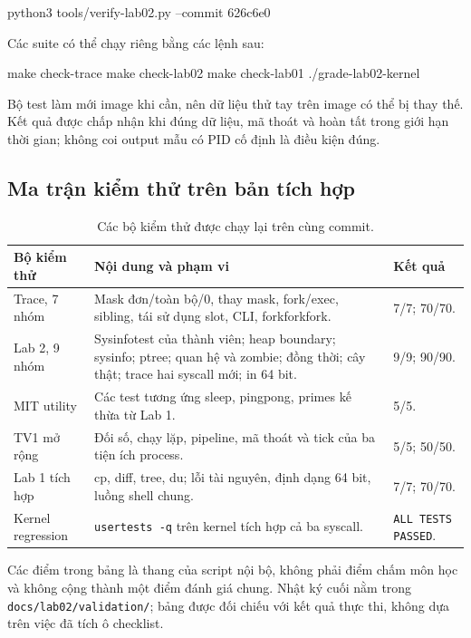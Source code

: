 \documentclass[12pt,a4paper]{article}
\newcommand{\code}[1]{\texttt{#1}}
\begin{document}
\begin{terminal}
python3 tools/verify-lab02.py --commit 626c6e0
\end{terminal}
Các suite có thể chạy riêng bằng các lệnh sau:
\begin{terminal}
make check-trace
make check-lab02
make check-lab01
./grade-lab02-kernel
\end{terminal}
Bộ test làm mới image khi cần, nên dữ liệu thử tay trên image có thể bị thay thế. Kết quả được chấp nhận khi đúng dữ liệu, mã thoát và hoàn tất trong giới hạn thời gian; không coi output mẫu có PID cố định là điều kiện đúng.

\subsection{Ma trận kiểm thử trên bản tích hợp}
\begin{table}[H]
\centering\small
\caption{Các bộ kiểm thử được chạy lại trên cùng commit.}
\label{tab:tests}
\begin{tabularx}{\textwidth}{@{}P{3.0cm}Y P{2.2cm}@{}}
\toprule
{}\textbf{Bộ kiểm thử} & \textbf{Nội dung và phạm vi} & \textbf{Kết quả}\\
\midrule
Trace, 7 nhóm & Mask đơn/toàn bộ/0, thay mask, fork/exec, sibling, tái sử dụng slot, CLI, forkforkfork. & 7/7; 70/70.\\
Lab 2, 9 nhóm & Sysinfotest của thành viên; heap boundary; sysinfo; ptree; quan hệ và zombie; đồng thời; cây thật; trace hai syscall mới; in 64 bit. & 9/9; 90/90.\\
MIT utility & Các test tương ứng sleep, pingpong, primes kế thừa từ Lab 1. & 5/5.\\
TV1 mở rộng & Đối số, chạy lặp, pipeline, mã thoát và tick của ba tiện ích process. & 5/5; 50/50.\\
Lab 1 tích hợp & cp, diff, tree, du; lỗi tài nguyên, định dạng 64 bit, luồng shell chung. & 7/7; 70/70.\\
Kernel regression & \code{usertests -q} trên kernel tích hợp cả ba syscall. & \code{ALL TESTS PASSED}.\\
\bottomrule
\end{tabularx}
\end{table}
Các điểm trong bảng là thang của script nội bộ, không phải điểm chấm môn học và không cộng thành một điểm đánh giá chung. Nhật ký cuối nằm trong \code{docs/lab02/validation/}; bảng được đối chiếu với kết quả thực thi, không dựa trên việc đã tích ô checklist.

\clearpage
\end{document}
